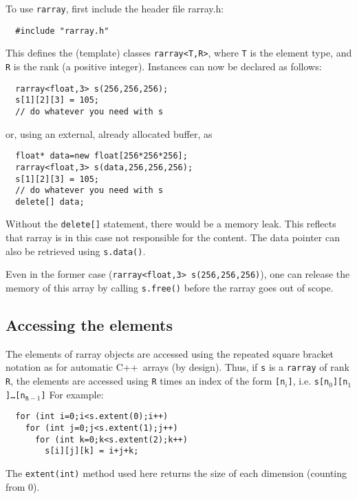 \documentclass[12pt,twoside]{article}
\newcommand{\cxx}{C{++}}
\begin{document}
To use \texttt{rarray}, first include the header file rarray.h:
\begin{framed}\vspace{-14pt}%
\begin{verbatim}
  #include "rarray.h"
\end{verbatim}%
\vspace{-14pt}
\end{framed}
This defines the (template) classes \texttt{rarray{\tt<}T,R{\tt>}}, where
\texttt T is the element type, and \texttt R is the
rank (a positive integer).  Instances can now be
declared as follows:
\begin{framed}\vspace{-18pt}%
\begin{verbatim}
  rarray<float,3> s(256,256,256);
  s[1][2][3] = 105;
  // do whatever you need with s
\end{verbatim}%
\vspace{-14pt}
\end{framed}
or, using an external, already allocated buffer, as
\begin{framed}\vspace{-18pt}%
\begin{verbatim}
  float* data=new float[256*256*256];  
  rarray<float,3> s(data,256,256,256);
  s[1][2][3] = 105;
  // do whatever you need with s
  delete[] data;
\end{verbatim}%
\vspace{-14pt}
\end{framed}
Without the \texttt{delete[]} statement, there would be a memory leak. This reflects that rarray is in this case not responsible
for the content. The data pointer can also be retrieved using
\texttt{s.data()}. 

Even in the former case (\texttt{rarray<float,3> s(256,256,256)}), one can release the memory of this array by calling \texttt{s.free()} before the rarray goes out of scope.

\subsection{Accessing the elements}

The elements of rarray objects are accessed using the repeated square
bracket notation as for automatic \cxx\ arrays (by design). Thus, if \texttt{s} is a \texttt{rarray} of rank \texttt R, the elements are accessed using \texttt{R} times an index of the form \texttt{[n$_i$]}, i.e. \texttt{s[n$_0$][n$_1$]\dots[n$_{\texttt{R}-1}$]}
For example:\vspace{-9pt}
\begin{framed}\vspace{-18pt}%
\begin{verbatim}
  for (int i=0;i<s.extent(0);i++)
    for (int j=0;j<s.extent(1);j++)
      for (int k=0;k<s.extent(2);k++)
        s[i][j][k] = i+j+k;
\end{verbatim}%
\vspace{-12pt}
\end{framed}\vspace{-8pt}\noindent
The \texttt{extent(int)} method used here returns the size of each dimension (counting from 0).
\end{document}
